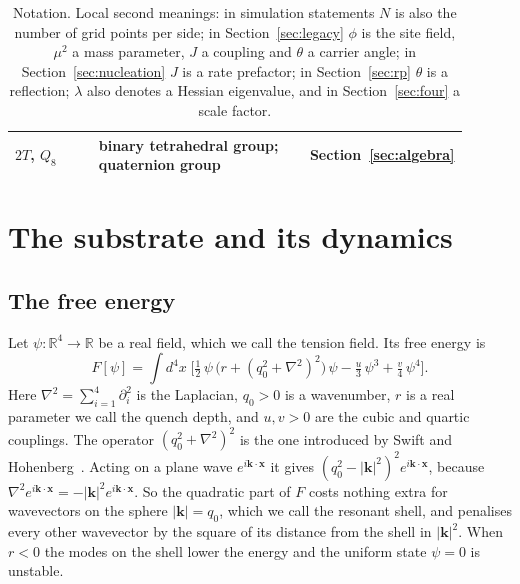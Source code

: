 \documentclass[a4paper,11pt]{article}
\numberwithin{equation}{section}
\theoremstyle{jsplain}
\theoremstyle{jsrem}
\begin{document}
\begin{table}[htbp]
\begin{tabular}{p{0.2\linewidth}p{0.5\linewidth}p{0.2\linewidth}}
$2T$, $Q_8$ & binary tetrahedral group; quaternion group & Section~\ref{sec:algebra}\\
\bottomrule
\end{tabular}
\caption{Notation. Local second meanings: in simulation statements $N$ is also the number of grid points per side; in Section~\ref{sec:legacy} $\phi$ is the site field, $\mu^2$ a mass parameter, $J$ a coupling and $\theta$ a carrier angle; in Section~\ref{sec:nucleation} $J$ is a rate prefactor; in Section~\ref{sec:rp} $\theta$ is a reflection; $\lambda$ also denotes a Hessian eigenvalue, and in Section~\ref{sec:four} a scale factor.}
\label{tab:notation}
\end{table}

\section{The substrate and its dynamics}\label{sec:substrate}

\subsection{The free energy}

Let $\psi:\mathbb{R}^4\to\mathbb{R}$ be a real field, which we call the tension field. Its free energy is
\begin{equation}\label{eq:F}
F[\psi]=\int d^4x\;\Big[\tfrac12\,\psi\,\big(r+(q_0^2+\nabla^2)^2\big)\,\psi-\tfrac{u}{3}\,\psi^3+\tfrac{v}{4}\,\psi^4\Big].
\end{equation}
Here $\nabla^2=\sum_{i=1}^4\partial_i^2$ is the Laplacian, $q_0>0$ is a wavenumber, $r$ is a real parameter we call the quench depth, and $u,v>0$ are the cubic and quartic couplings. The operator $(q_0^2+\nabla^2)^2$ is the one introduced by Swift and Hohenberg~\cite{ref2}. Acting on a plane wave $e^{i\mathbf{k}\cdot\mathbf{x}}$ it gives $(q_0^2-|\mathbf{k}|^2)^2e^{i\mathbf{k}\cdot\mathbf{x}}$, because $\nabla^2e^{i\mathbf{k}\cdot\mathbf{x}}=-|\mathbf{k}|^2e^{i\mathbf{k}\cdot\mathbf{x}}$. So the quadratic part of $F$ costs nothing extra for wavevectors on the sphere $|\mathbf{k}|=q_0$, which we call the resonant shell, and penalises every other wavevector by the square of its distance from the shell in $|\mathbf{k}|^2$. When $r<0$ the modes on the shell lower the energy and the uniform state $\psi=0$ is unstable.
\end{document}
